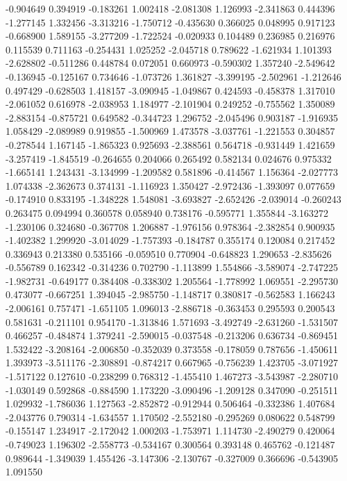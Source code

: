 -0.904649
0.394919
-0.183261
1.002418
-2.081308
1.126993
-2.341863
0.444396
-1.277145
1.332456
-3.313216
-1.750712
-0.435630
0.366025
0.048995
0.917123
-0.668900
1.589155
-3.277209
-1.722524
-0.020933
0.104489
0.236985
0.216976
0.115539
0.711163
-0.254431
1.025252
-2.045718
0.789622
-1.621934
1.101393
-2.628802
-0.511286
0.448784
0.072051
0.660973
-0.590302
1.357240
-2.549642
-0.136945
-0.125167
0.734646
-1.073726
1.361827
-3.399195
-2.502961
-1.212646
0.497429
-0.628503
1.418157
-3.090945
-1.049867
0.424593
-0.458378
1.317010
-2.061052
0.616978
-2.038953
1.184977
-2.101904
0.249252
-0.755562
1.350089
-2.883154
-0.875721
0.649582
-0.344723
1.296752
-2.045496
0.903187
-1.916935
1.058429
-2.089989
0.919855
-1.500969
1.473578
-3.037761
-1.221553
0.304857
-0.278544
1.167145
-1.865323
0.925693
-2.388561
0.564718
-0.931449
1.421659
-3.257419
-1.845519
-0.264655
0.204066
0.265492
0.582134
0.024676
0.975332
-1.665141
1.243431
-3.134999
-1.209582
0.581896
-0.414567
1.156364
-2.027773
1.074338
-2.362673
0.374131
-1.116923
1.350427
-2.972436
-1.393097
0.077659
-0.174910
0.833195
-1.348228
1.548081
-3.693827
-2.652426
-2.039014
-0.260243
0.263475
0.094994
0.360578
0.058940
0.738176
-0.595771
1.355844
-3.163272
-1.230106
0.324680
-0.367708
1.206887
-1.976156
0.978364
-2.382854
0.900935
-1.402382
1.299920
-3.014029
-1.757393
-0.184787
0.355174
0.120084
0.217452
0.336943
0.213380
0.535166
-0.059510
0.770904
-0.648823
1.290653
-2.835626
-0.556789
0.162342
-0.314236
0.702790
-1.113899
1.554866
-3.589074
-2.747225
-1.982731
-0.649177
0.384408
-0.338302
1.205564
-1.778992
1.069551
-2.295730
0.473077
-0.667251
1.394045
-2.985750
-1.148717
0.380817
-0.562583
1.166243
-2.006161
0.757471
-1.651105
1.096013
-2.886718
-0.363453
0.295593
0.200543
0.581631
-0.211101
0.954170
-1.313846
1.571693
-3.492749
-2.631260
-1.531507
0.466257
-0.484874
1.379241
-2.590015
-0.037548
-0.213206
0.636734
-0.869451
1.532422
-3.208164
-2.006850
-0.352039
0.373558
-0.178059
0.787656
-1.450611
1.393973
-3.511176
-2.308891
-0.874217
0.667965
-0.756239
1.423705
-3.071927
-1.517122
0.127610
-0.238299
0.768312
-1.455410
1.467273
-3.543987
-2.280710
-1.030149
0.592868
-0.884590
1.173220
-3.090496
-1.209128
0.347090
-0.251511
1.029932
-1.786036
1.127563
-2.852872
-0.912944
0.506464
-0.332386
1.407684
-2.043776
0.790314
-1.634557
1.170502
-2.552180
-0.295269
0.080622
0.548799
-0.155147
1.234917
-2.172042
1.000203
-1.753971
1.114730
-2.490279
0.420064
-0.749023
1.196302
-2.558773
-0.534167
0.300564
0.393148
0.465762
-0.121487
0.989644
-1.349039
1.455426
-3.147306
-2.130767
-0.327009
0.366696
-0.543905
1.091550
